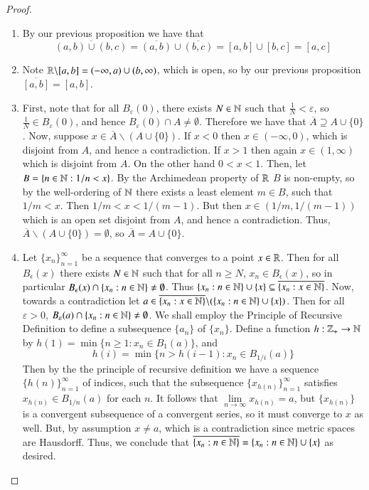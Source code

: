 \documentclass[12pt, a4paper, oneside, openright, titlepage]{book}
\begin{document}
\begin{eg}
\begin{enumerate}
\begin{proof}
\begin{enumerate}
                    \item By our previous proposition we have that $$\overline{(a,b)\cup(b,c)} = \overline{(a,b)}\cup\overline{(b,c)} = [a,b]\cup[b,c] = [a,c]$$
                    \item Note $\mathbb R\backslash[a,b] = (-\infty,a)\cup(b,\infty)$, which is open, so by our previous proposition $\overline{[a,b]} = [a,b]$.
                    \item First, note that for all $B_{\varepsilon}(0)$, there exists $N \in \mathbb N$ such that $\frac{1}{N} < \varepsilon$, so $\frac{1}{N} \in B_{\varepsilon}(0)$, and hence $B_{\varepsilon}(0) \cap A \neq \emptyset.$ Therefore we have that $\overline{A} \supseteq A \cup \{0\}$. Now, suppose $x \in \overline{A}\backslash (A\cup\{0\})$. If $x < 0$ then $x \in (-\infty, 0)$, which is disjoint from $A$, and hence a contradiction. If $x > 1$ then again $x \in (1,\infty)$ which is disjoint from $A$. On the other hand $0 < x < 1$. Then, let $B = \{n \in \mathbb N: 1/n < x\}$. By the Archimedean property of $\mathbb R$ $B$ is non-empty, so by the well-ordering of $\mathbb N$ there exists a least element $m \in B$, such that $1/m < x$. Then $1/m < x < 1/(m-1)$. But then $x \in (1/m,1/(m-1))$ which is an open set disjoint from $A$, and hence a contradiction. Thus, $\overline{A}\backslash (A\cup\{0\}) = \emptyset$, so $\overline{A} = A\cup\{0\}$.
                    \item Let $\{x_n\}_{n=1}^{\infty}$ be a sequence that converges to a point $x \in \mathbb R$. Then for all $B_{\epsilon}(x)$ there exists $N \in \mathbb N$ such that for all $n \geq N$, $x_n \in B_{\epsilon}(x)$, so in particular $B_{\epsilon}(x) \cap \{x_n:n\in\mathbb N\} \neq \emptyset$. Thus $\{x_n:n\in\mathbb N\}\cup\{x\} \subseteq \overline{\{x_n:x\in\mathbb N\}}$. Now, towards a contradiction let $a \in \overline{\{x_n:x\in\mathbb N\}}\backslash (\{x_n:n\in\mathbb N\}\cup\{x\})$. Then for all $\varepsilon > 0$, $B_{\varepsilon}(a)\cap\{x_n:n\in\mathbb N\} \neq \emptyset$. We shall employ the Principle of Recursive Definition to define a subsequence $\{a_n\}$ of $\{x_n\}$. Define a function $h:\mathbb Z_+\rightarrow \mathbb N$ by $h(1) = \min\{n \geq 1: x_n \in B_1(a)\}$, and \begin{equation*}
                            h(i) = \min\{n>h(i-1):x_n \in B_{1/i}(a)\}
                    \end{equation*}
                        Then by the the principle of recursive definition we have a sequence $\{h(n)\}_{n=1}^{\infty}$ of indices, such that the subsequence $\{x_{h(n)}\}_{n=1}^{\infty}$ satisfies $x_{h(n)} \in B_{1/n}(a)$ for each $n$. It follows that $\lim\limits_{n\rightarrow \infty}x_{h(n)} = a$, but $\{x_{h(n)}\}$ is a convergent subsequence of a convergent series, so it must converge to $x$ as well. But, by assumption $x \neq a$, which is a contradiction since metric spaces are Hausdorff. Thus, we conclude that $\overline{\{x_n:n\in\mathbb N\}} = \{x_n:n\in\mathbb N\}\cup\{x\}$ as desired.

\end{enumerate}
\end{proof}
\end{enumerate}
\end{eg}
\end{document}
